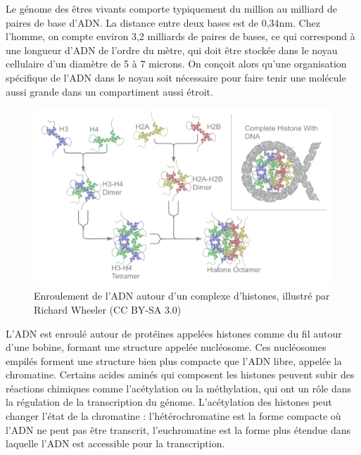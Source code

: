 Le génome des êtres vivants comporte typiquement du million au milliard de paires de base d'ADN. La distance entre deux bases est de 0,34nm. Chez l'homme, on compte environ 3,2 milliards de paires de bases, ce qui correspond à une longueur d'ADN de l'ordre du mètre, qui doit être stockée dans le noyau cellulaire d'un diamètre de 5 à 7 microns. 
On conçoit alors qu'une organisation spécifique de l'ADN dans le noyau soit nécessaire pour faire tenir une molécule aussi grande dans un compartiment aussi étroit. 

\begin{figure}[h!]
\includegraphics[scale=0.3]{Nucleosome_structure_by_richard_wheeler}
\caption{Enroulement de l'ADN autour d'un complexe d'histones, illustré par Richard Wheeler (CC BY-SA 3.0)}
\end{figure}

L'ADN est enroulé autour de protéines appelées histones comme du fil autour d'une bobine, formant une structure appelée nucléosome. Ces nucléosomes empilés forment une structure bien plus compacte que l'ADN libre, appelée la chromatine. Certains acides aminés qui composent les histones peuvent subir des réactions chimiques comme l'acétylation ou la méthylation, qui ont un rôle dans la régulation de la transcription du génome. L'acétylation des histones peut changer l'état de la chromatine : l'hétérochromatine est la forme compacte où l'ADN ne peut pas être transcrit, l'euchromatine est la forme plus étendue dans laquelle l'ADN est accessible pour la transcription. 

